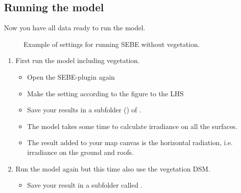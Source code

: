 \documentclass[letterpaper,10pt,english]{sphinxmanual}
\begin{document}
\subsection{Running the model}
\label{\detokenize{Tutorials/SEBE:running-the-model}}
Now you have all data ready to run the model.

\begin{figure}[htbp]
\centering
\capstart

\noindent{}
\caption{Example of settings for running SEBE without vegetation.}\label{\detokenize{Tutorials/SEBE:id5}}\end{figure}
\begin{enumerate}
\item {} 
First run the model  including vegetation.
\begin{itemize}
\item {} 
Open the SEBE-plugin again

\item {} 
Make the setting according to the figure to the LHS

\item {} 
Save your results in a subfolder () of .

\item {} 
The model takes some time to calculate irradiance on all the
surfaces.

\item {} 
The result added to your map canvas is the horizontal radiation,
i.e. irradiance on the ground and roofs.

\end{itemize}

\item {} 
Run the model again but this time also use the vegetation DSM.
\begin{itemize}
\item {} 
Save your result in a subfolder called .

\end{itemize}

\end{enumerate}
\end{document}
